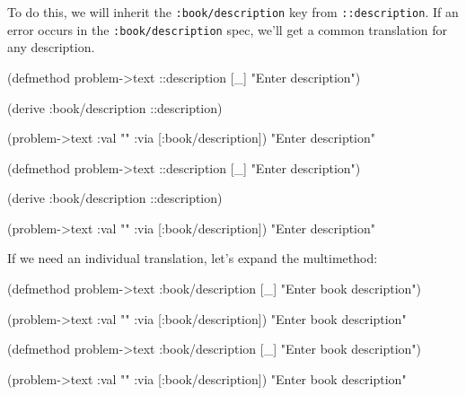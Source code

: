 To do this, we will inherit the \verb|:book/description| key from
\verb|::description|. If an error occurs in the \verb|:book/description| spec, we'll get a common translation for any description.


\ifx\DEVICETYPE\MOBILE

  \begin{clojure}
(defmethod problem->text
  ::description [_] "Enter description")

(derive :book/description ::description)

(problem->text
  {:val "" :via [:book/description]})
"Enter description"
  \end{clojure}

\else

  \begin{clojure}
(defmethod problem->text ::description [_]
  "Enter description")

(derive :book/description ::description)

(problem->text {:val "" :via [:book/description]})
"Enter description"
  \end{clojure}

\fi

\noindent
If we need an individual translation, let's expand the multimethod:

\ifx\DEVICETYPE\MOBILE

  \begin{clojure}
(defmethod problem->text
  :book/description [_]
  "Enter book description")

(problem->text
  {:val "" :via [:book/description]})
"Enter book description"
  \end{clojure}

\else

  \begin{clojure}
(defmethod problem->text :book/description [_]
  "Enter book description")

(problem->text {:val "" :via [:book/description]})
"Enter book description"
  \end{clojure}

